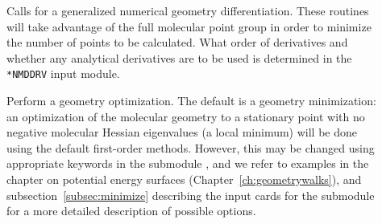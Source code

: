 \begin{description}
\item[] Calls for a generalized numerical geometry
differentiation. These routines will take advantage of the full
molecular point group in order to minimize the number of points to be
calculated. What order of derivatives and whether any analytical
derivatives are to be used is determined in the \verb|*NMDDRV| input
module.

\item[] Perform a geometry optimization.
The default is a geometry minimization:
an optimization of the molecular geometry to a stationary point with no
negative molecular Hessian eigenvalues
(a local minimum) will be done using the default first-order
methods. However, this may be changed using appropriate
keywords in the submodule , and we refer to examples in
the chapter on potential energy surfaces
(Chapter~\ref{ch:geometrywalks}), and subsection~\ref{subsec:minimize}
describing the input cards for the  submodule for a more
detailed description of possible options.


%


\end{description}

